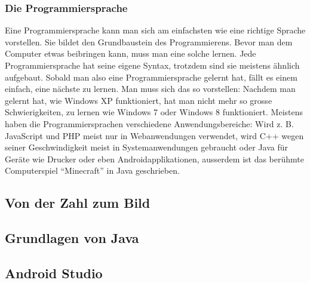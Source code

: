 \subsubsection{Die Programmiersprache}
Eine Programmiersprache kann man sich am einfachsten wie eine richtige Sprache vorstellen. Sie bildet den Grundbaustein des Programmierens. Bevor man dem Computer etwas  beibringen kann, muss man eine solche lernen. Jede Programmiersprache hat seine eigene Syntax, trotzdem sind sie meistens ähnlich aufgebaut. Sobald man also eine Programmiersprache gelernt hat, fällt es einem einfach, eine nächste zu lernen. Man muss sich das so vorstellen: Nachdem man gelernt hat, wie Windows XP funktioniert, hat man nicht mehr so grosse Schwierigkeiten, zu lernen wie Windows 7 oder Windows 8 funktioniert. Meistens haben die Programmiersprachen verschiedene Anwendungsbereiche: Wird z. B. JavaScript und PHP meist nur in Webanwendungen verwendet, wird C++ wegen seiner Geschwindigkeit meist in Systemanwendungen gebraucht oder Java für Geräte wie Drucker oder eben Androidapplikationen, ausserdem ist das berühmte Computerspiel "`Minecraft"' in Java geschrieben.
\subsection{Von der Zahl zum Bild}

\subsection{Grundlagen von Java}

\subsection{Android Studio}